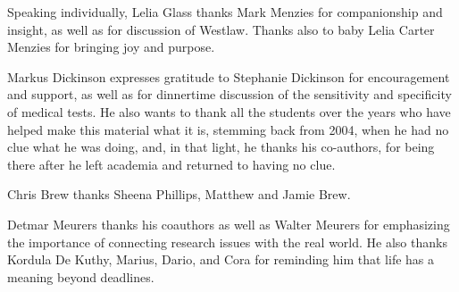Speaking individually, Lelia Glass thanks Mark Menzies for companionship and insight, as well as for discussion of Westlaw.  Thanks also to baby Lelia Carter Menzies for bringing joy and purpose.

Markus Dickinson expresses gratitude to Stephanie Dickinson for encouragement and support, as well as for dinnertime discussion of the sensitivity and specificity of medical tests. He also wants to thank all the students over the years who have helped make this material what it is, stemming back from 2004, when he had no clue what he was doing, and, in that light, he thanks his co-authors, for being there after he left academia and returned to having no clue.

Chris Brew thanks Sheena Phillips, Matthew and Jamie Brew.

Detmar Meurers thanks his coauthors as well as Walter Meurers for emphasizing the importance of connecting research issues with the real world.   He also thanks Kordula De Kuthy, Marius, Dario, and Cora for reminding him that life has a meaning beyond deadlines.

